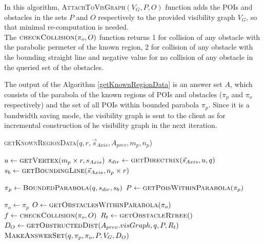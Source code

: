 In this algorithm, \textsc{AttachToVisGraph}$(V_G, P, O)$ function adds the POIs and obstacles in the sets $P$ and $O$ respectively to the provided visibility graph $V_G$, so that minimal re-computation is needed.\\

The $\textsc{checkCollision}(\pi_o, O)$ function returns 1 for collision of any obstacle with the parabolic permeter of the known region, 2 for collision of any obstacle with the bounding straight line and negative value for no collision of any obstacle in the queried set of the obstacles.

The output of the Algorithm \ref{getKnownRegionData} is an answer set $A$, which consists of the parabola of the known regions of POIs and obstacles ($\pi_p$ and $\pi_o$ respectively) and the set of all POIs within bounded parabola $\pi_p$. Since it is a bandwidth saving mode, the visibility graph is sent to the client as for incremental construction of he visibility graph in the next iteration.\\


\begin{algorithm}
\caption{\textsc{getKnownRegionData}($q, r, \vec{s}_{Axis}, A_{prev}, m_p, n_p$)}
\label{getKnownRegionData}
	
	$u \gets \textsc{getVertex}(m_p \times r, s_{Axis})$ \;
   	$s_{dir} \gets \textsc{getDirectrix}(\vec{s}_{Axis}, u, q)$\;
	$s_b \gets \textsc{getBoundingLine}(\vec{s}_{Axis}, n_p \times r) $\;
	
	$\pi_p \gets \textsc{BoundedParabola}( q, s_{dir}, s_b)$\;
	$P \gets \textsc{getPoisWithinParabola}( \pi_p )$\;
	
	$ \pi_o \gets \pi_p$\;
	$O \gets \textsc{getObstaclesWithinParabola}( \pi_o )$\;
	$f \gets \textsc{checkCollision}(\pi_o, O)$\;
  	$ R_t \gets \textsc{getObstacleRtree}()$\;
  	$ D_O \gets \textsc{getObstructedDist}(A_{prev}.visGraph, q, P, R_t) $\;
	\Return $\textsc{MakeAnswerSet}(q, \pi_p, \pi_o, P, V_G, D_O)  $\;
	
\end{algorithm}

